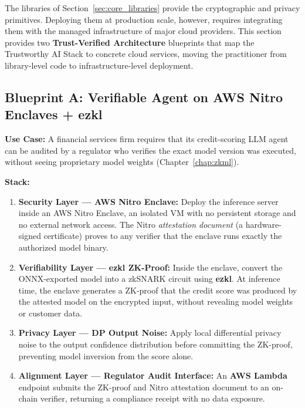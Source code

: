 The libraries of Section~\ref{sec:core_libraries} provide the cryptographic and privacy primitives. Deploying them at production scale, however, requires integrating them with the managed infrastructure of major cloud providers. This section provides two \textbf{Trust-Verified Architecture} blueprints that map the Trustworthy AI Stack to concrete cloud services, moving the practitioner from library-level code to infrastructure-level deployment.

\subsection{Blueprint A: Verifiable Agent on AWS Nitro Enclaves + ezkl}
\label{sec:aws_blueprint}

\textbf{Use Case:} A financial services firm requires that its credit-scoring LLM agent can be audited by a regulator who verifies the exact model version was executed, without seeing proprietary model weights (Chapter~\ref{chap:zkml}).

\textbf{Stack:}
\begin{enumerate}
  \item \textbf{Security Layer --- AWS Nitro Enclave:} Deploy the inference server inside an AWS Nitro Enclave, an isolated VM with no persistent storage and no external network access. The Nitro \textit{attestation document} (a hardware-signed certificate) proves to any verifier that the enclave runs exactly the authorized model binary.
  \item \textbf{Verifiability Layer --- ezkl ZK-Proof:} Inside the enclave, convert the ONNX-exported model into a zkSNARK circuit using \textbf{ezkl}. At inference time, the enclave generates a ZK-proof that the credit score was produced by the attested model on the encrypted input, without revealing model weights or customer data.
  \item \textbf{Privacy Layer --- DP Output Noise:} Apply local differential privacy noise to the output confidence distribution before committing the ZK-proof, preventing model inversion from the score alone.
  \item \textbf{Alignment Layer --- Regulator Audit Interface:} An \textbf{AWS Lambda} endpoint submits the ZK-proof and Nitro attestation document to an on-chain verifier, returning a compliance receipt with no data exposure.
\end{enumerate}

